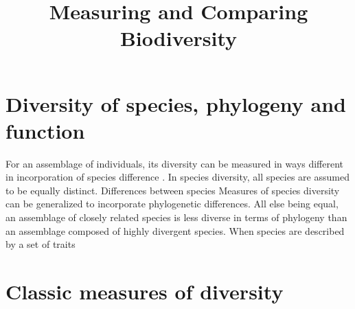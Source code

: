 \documentclass[11pt]{article}
\title{Measuring and Comparing Biodiversity}
\date{}
\begin{document}

% 
% 


  \maketitle

  \linenumbers
\section{Diversity of species, phylogeny and function}
For an assemblage of individuals, its diversity can be measured in ways different in incorporation of species difference \citep{chao2014unifying}. 
In species diversity, all species are assumed to be equally distinct. 
Differences between species
Measures of species diversity can be generalized to incorporate phylogenetic differences. 
All else being equal, an assemblage of closely related species is less diverse in terms of phylogeny than an assemblage composed of highly divergent species. 
When species are described by a set of traits



\section{Classic measures of diversity}

\newpage
  

  
\end{document}

